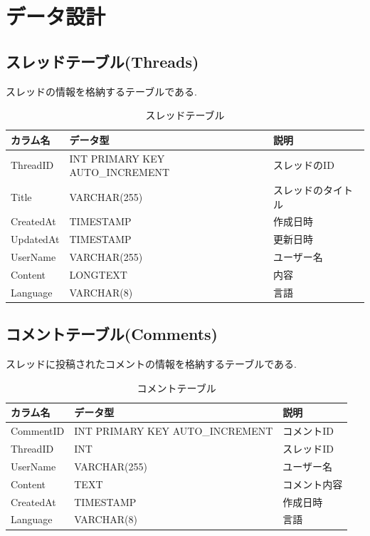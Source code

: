 \documentclass[b5paper,12pt,dvipdfmx]{jsreport}
\begin{document}
\section{データ設計}

\subsection*{スレッドテーブル(Threads)}

スレッドの情報を格納するテーブルである.

\begin{table}[H]
    \centering
    \caption{スレッドテーブル}
    \begin{tabular}{|l|l|l|}
        \hline
        \textbf{カラム名} & \textbf{データ型} & \textbf{説明} \\
        \hline
        ThreadID   & INT PRIMARY KEY AUTO\_INCREMENT & スレッドのID \\
        Title      & VARCHAR(255) & スレッドのタイトル \\
        CreatedAt  & TIMESTAMP & 作成日時 \\
        UpdatedAt  & TIMESTAMP & 更新日時 \\
        UserName   & VARCHAR(255) & ユーザー名 \\
        Content    & LONGTEXT & 内容 \\
        Language   & VARCHAR(8) & 言語 \\
        \hline
    \end{tabular}
\end{table}

\subsection*{コメントテーブル(Comments)}

スレッドに投稿されたコメントの情報を格納するテーブルである.

\begin{table}[H]
    \centering
    \caption{コメントテーブル}
    \begin{tabular}{|l|l|l|}
        \hline
        \textbf{カラム名} & \textbf{データ型} & \textbf{説明} \\
        \hline
        CommentID  & INT PRIMARY KEY AUTO\_INCREMENT & コメントID \\
        ThreadID   & INT & スレッドID \\
        UserName   & VARCHAR(255) & ユーザー名 \\
        Content    & TEXT & コメント内容 \\
        CreatedAt  & TIMESTAMP & 作成日時 \\
        Language   & VARCHAR(8) & 言語 \\
        \hline
    \end{tabular}
\end{table}
\end{document}
